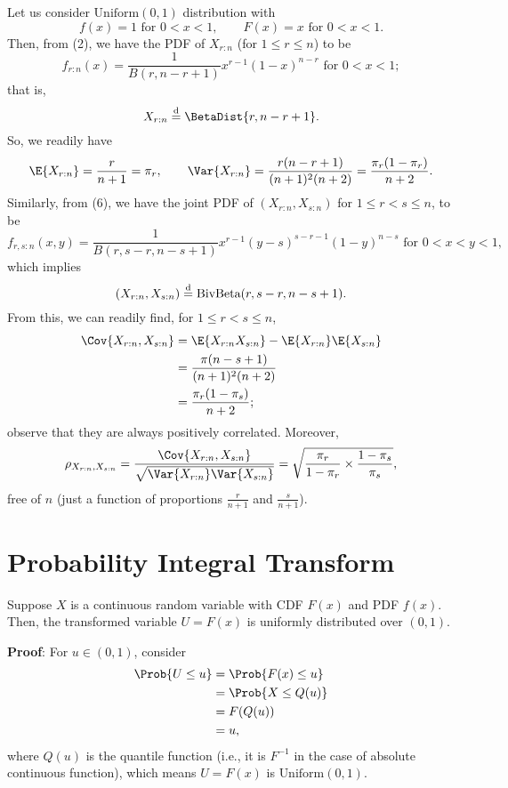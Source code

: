\begin{Example}{}{}
    Let us consider $ \text{Uniform}(0,1) $ distribution with
    \[ f(x)=1\text{ for }0<x<1,\qquad F(x)=x\text{ for }0<x<1. \]
    Then, from (2), we have the PDF of $ X_{r:n} $ (for $ 1\le r\le n $) to be
    \[ f_{r:n}(x)=\frac{1}{B(r,n-r+1)}x^{r-1}(1-x)^{n-r}\text{ for }0<x<1; \]
    that is,
    \[ X_{r:n}\dist \BetaDist{r,n-r+1}. \]
    So, we readily have
    \[ \E{X_{r:n}}=\frac{r}{n+1}=\pi_r,\qquad \Var{X_{r:n}}=\frac{r(n-r+1)}{(n+1)^2(n+2)}=\frac{\pi_r(1-\pi_r)}{n+2}. \]
    Similarly, from (6), we have the joint PDF of $ (X_{r:n},X_{s:n}) $
    for $ 1\le r<s\le n $, to be
    \[ f_{r,s:n}(x,y)=\frac{1}{B(r,s-r,n-s+1)}x^{r-1}(y-s)^{s-r-1}(1-y)^{n-s}\text{ for }0<x<y<1, \]
    which implies
    \[ (X_{r:n},X_{s:n})\overset{\text{d}}{=} \text{BivBeta}(r,s-r,n-s+1). \]
    From this, we can readily find, for $ 1\le r<s\le n $,
    \begin{align*}
        \Cov{X_{r:n},X_{s:n}}
         & =\E{X_{r:n}X_{s:n}}-\E{X_{r:n}}\E{X_{s:n}} \\
         & =\frac{\pi(n-s+1)}{(n+1)^2(n+2)}           \\
         & =\frac{\pi_r(1-\pi_s)}{n+2};
    \end{align*}
    observe that they are always positively correlated. Moreover,
    \[ \rho_{X_{r:n},X_{s:n}}=\frac{\Cov{X_{r:n},X_{s:n}}}{\sqrt{\Var{X_{r:n}}\Var{X_{s:n}}}}
        =\sqrt{\frac{\pi_r}{1-\pi_r}\times\frac{1-\pi_s}{\pi_s}}, \]
    free of $ n $ (just a function of proportions $ \frac{r}{n+1} $ and $ \frac{s}{n+1} $).
\end{Example}
\section*{Probability Integral Transform}
Suppose $ X $ is a continuous random variable with CDF $ F(x) $ and PDF
$ f(x) $. Then, the transformed variable $ U=F(x) $ is uniformly distributed
over $ (0,1) $.

\textbf{Proof}: For $ u\in (0,1) $, consider
\begin{align*}
    \Prob{U\le u}
     & =\Prob{F(x)\le u} \\
     & =\Prob{X\le Q(u)} \\
     & =F(Q(u))          \\
     & =u,
\end{align*}
where $ Q(u) $ is the quantile function (i.e., it is $ F^{-1} $ in the case
of absolute continuous function), which means
$ U=F(x) $ is $ \text{Uniform}(0,1) $.

